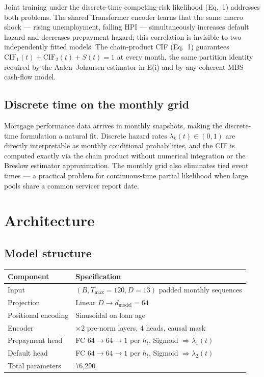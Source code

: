 \documentclass[11pt,a4paper]{article}
\begin{document}
Joint training under the discrete-time competing-risk likelihood (Eq.~1) addresses both problems.
The shared Transformer encoder learns that the same macro shock --- rising unemployment, falling HPI --- simultaneously increases default hazard and decreases prepayment hazard; this correlation is invisible to two independently fitted models.
The chain-product CIF (Eq.~1) guarantees $\text{CIF}_1(t) + \text{CIF}_2(t) + S(t) = 1$ at every month, the same partition identity required by the Aalen--Johansen estimator in E(i) and by any coherent MBS cash-flow model.

\subsection{Discrete time on the monthly grid}

Mortgage performance data arrives in monthly snapshots, making the discrete-time formulation a natural fit.
Discrete hazard rates $\lambda_k(t) \in (0,1)$ are directly interpretable as monthly conditional probabilities, and the CIF is computed exactly via the chain product without numerical integration or the Breslow estimator approximation.
The monthly grid also eliminates tied event times --- a practical problem for continuous-time partial likelihood when large pools share a common servicer report date.

\section{Architecture}

\subsection{Model structure}

\begin{center}
\small
\begin{tabular}{ll}
\toprule
\textbf{Component} & \textbf{Specification} \\
\midrule
Input & $(B, T_{\max}{=}120, D{=}13)$ padded monthly sequences \\
Projection & Linear $D \to d_{\text{model}} = 64$ \\
Positional encoding & Sinusoidal on loan age \\
Encoder & $\times 2$ pre-norm layers, 4 heads, causal mask \\
Prepayment head & FC $64 \to 64 \to 1$ per $h_t$, Sigmoid $\Rightarrow \lambda_1(t)$ \\
Default head & FC $64 \to 64 \to 1$ per $h_t$, Sigmoid $\Rightarrow \lambda_2(t)$ \\
Total parameters & 76,290 \\
\bottomrule
\end{tabular}
\end{center}
\end{document}
